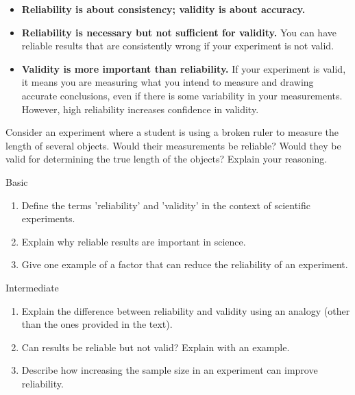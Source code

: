 \begin{itemize}
    \item \textbf{Reliability is about consistency; validity is about accuracy.}
    \item \textbf{Reliability is necessary but not sufficient for validity.} You can have reliable results that are consistently wrong if your experiment is not valid.
    \item \textbf{Validity is more important than reliability.} If your experiment is valid, it means you are measuring what you intend to measure and drawing accurate conclusions, even if there is some variability in your measurements. However, high reliability increases confidence in validity.
\end{itemize}

\begin{stopandthink}
Consider an experiment where a student is using a broken ruler to measure the length of several objects. Would their measurements be reliable? Would they be valid for determining the true length of the objects? Explain your reasoning.
\end{stopandthink}

\begin{tieredquestions}{Basic}
\begin{enumerate}
    \item Define the terms 'reliability' and 'validity' in the context of scientific experiments.
    \item Explain why reliable results are important in science.
    \item Give one example of a factor that can reduce the reliability of an experiment.
\end{enumerate}
\end{tieredquestions}

\begin{tieredquestions}{Intermediate}
\begin{enumerate}
    \item Explain the difference between reliability and validity using an analogy (other than the ones provided in the text).
    \item Can results be reliable but not valid? Explain with an example.
    \item  Describe how increasing the sample size in an experiment can improve reliability.
\end{enumerate}
\end{tieredquestions}

